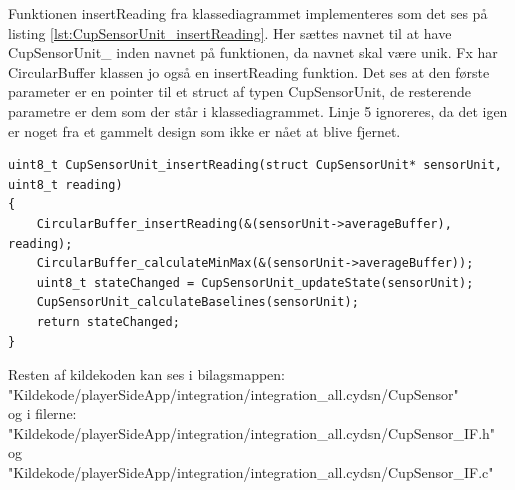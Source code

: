 \documentclass[Softwaredesign/Softwaredesign_main.tex]{subfiles}
\begin{document}
Funktionen insertReading fra klassediagrammet implementeres som det ses på listing \ref{lst:CupSensorUnit_insertReading}. Her sættes navnet til at have CupSensorUnit\_ inden navnet på funktionen, da navnet skal være unik. Fx har CircularBuffer klassen jo også en insertReading funktion. Det ses at den første parameter er en pointer til et struct af typen CupSensorUnit, de resterende parametre er dem som der står i klassediagrammet. Linje 5 ignoreres, da det igen er noget fra et gammelt design som ikke er nået at blive fjernet.

\begin{lstlisting}[caption={Eksempel på insertReading funktion},style=customc,label={lst:CupSensorUnit_insertReading}]
uint8_t CupSensorUnit_insertReading(struct CupSensorUnit* sensorUnit, uint8_t reading)
{
    CircularBuffer_insertReading(&(sensorUnit->averageBuffer), reading);
    CircularBuffer_calculateMinMax(&(sensorUnit->averageBuffer));
    uint8_t stateChanged = CupSensorUnit_updateState(sensorUnit);
    CupSensorUnit_calculateBaselines(sensorUnit);
    return stateChanged;
}
\end{lstlisting}

Resten af kildekoden kan ses i bilagsmappen:\\ "Kildekode/playerSideApp/integration/integration\_all.cydsn/CupSensor"\\ og i filerne:\\ "Kildekode/playerSideApp/integration/integration\_all.cydsn/CupSensor\_IF.h" \\og\\ 
"Kildekode/playerSideApp/integration/integration\_all.cydsn/CupSensor\_IF.c" 
\end{document}
